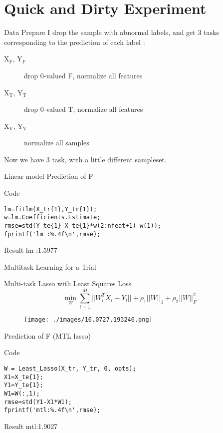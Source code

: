 \documentclass[bigger]{beamer}
\begin{document}
\section{Quick and Dirty Experiment}
\label{sec-4}
\begin{frame}[label=sec-4-1]{Data Prepare}
I drop the sample with abnormal labels, and get 3 tasks corresponding
to the prediction of each label :

\begin{description}
\item[{X$_{\text{F}}$, Y$_{\text{F}}$}] drop 0-valued F, normalize all features
\item[{X$_{\text{T}}$, Y$_{\text{T}}$}] drop 0-valued T, normalize all features
\item[{X$_{\text{V}}$, Y$_{\text{V}}$}] normalize all samples
\end{description}

Now we have 3 task, with a little different sampleset.
\end{frame}
\begin{frame}[fragile,label=sec-4-2]{Linear model Prediction of F}
 \begin{block}{Code}
\begin{verbatim}
lm=fitlm(X_tr{1},Y_tr{1});
w=lm.Coefficients.Estimate;
rmse=std(Y_te{1}-X_te{1}*w(2:nfeat+1)-w(1));
fprintf('lm :%.4f\n',rmse);
\end{verbatim}
\end{block}
\begin{block}{Result}
lm :1.5977
\end{block}
\end{frame}
\begin{frame}[label=sec-4-3]{Multitask Learning for a Trial}
\begin{block}{Multi-task Lasso with Least Squares Loss}
\begin{equation*}
\min_W \sum_{i=1}^M ||W^T_iX_i-Y_i|| + \rho_1 ||W||_1 + \rho_2 ||W||_F^2
\end{equation*}
\end{block}
\begin{figure}[htb]
\centering
\texttt{[image: ./images/16.0727.193246.png]}
\end{figure}
\end{frame}
\begin{frame}[fragile,label=sec-4-4]{Prediction of F (MTL lasso)}
 \begin{block}{Code}
\begin{verbatim}
W = Least_Lasso(X_tr, Y_tr, 0, opts);
X1=X_te{1};
Y1=Y_te{1};
W1=W(:,1);
rmse=std(Y1-X1*W1);
fprintf('mtl:%.4f\n',rmse);
\end{verbatim}
\end{block}
\begin{block}{Result}
mtl:1.9027
\end{block}
\end{frame}
\end{document}
